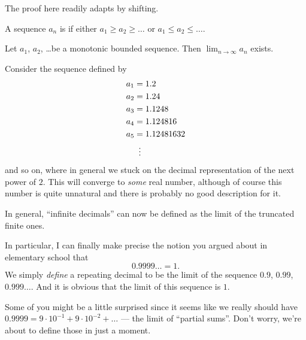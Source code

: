 The proof here readily adapts by shifting.
\begin{definition}
	A sequence $a_n$ is 
	if either $a_1 \ge a_2 \ge \dots$
	or $a_1 \le a_2 \le \dots$.
\end{definition}

\begin{theorem}
	Let $a_1$, $a_2$, \dots be a monotonic bounded sequence.
	Then $\lim_{n \to \infty} a_n$ exists.
	\label{thm:monotonic_bounded}
\end{theorem}

\begin{example}
	Consider the sequence defined by
	\begin{align*}
		a_1 &= 1.2 \\
		a_2 &= 1.24 \\
		a_3 &= 1.1248 \\
		a_4 &= 1.124816 \\
		a_5 &= 1.12481632 \\
		&\vdotswithin=
	\end{align*}
	and so on, where in general we stuck
	on the decimal representation of the next power of $2$.
	This will converge to \emph{some} real number,
	although of course this number
	is quite unnatural and there is probably no good description for it.
\end{example}
In general, ``infinite decimals''
can now be defined as the limit of the truncated finite ones.

\begin{example}
	[$0.9999\dots = 1$]
	In particular, I can finally make precise the notion
	you argued about in elementary school that
	\[ 0.9999\dots = 1. \]
	We simply \emph{define} a repeating decimal
	to be the limit of the sequence $0.9$, $0.99$, $0.999\dots$.
	And it is obvious that the limit of this sequence is $1$.
\end{example}

Some of you might be a little surprised since
it seems like we really should have
$0.9999 = 9 \cdot 10^{-1} + 9 \cdot 10^{-2} + \dots$ ---
the limit of ``partial sums''.
Don't worry, we're about to define those in just a moment.

\medskip


